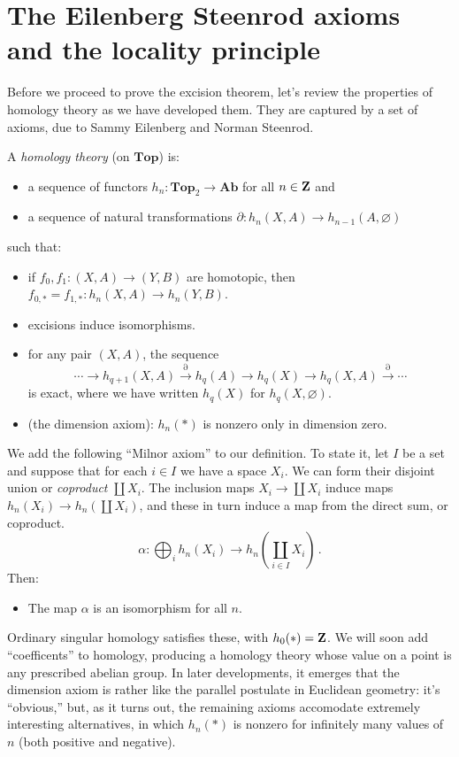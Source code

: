 \section{The Eilenberg Steenrod axioms and the locality principle}


Before we proceed to prove the excision theorem, let's review the properties of homology theory as we have developed them. They are captured by a set of axioms, due to Sammy Eilenberg and Norman Steenrod. 
\begin{definition}
A {\em homology theory} (on $\mathbf{Top}$) is:
\begin{itemize}
\item a sequence of functors $h_n:\mathbf{Top}_2\to\mathbf{Ab}$ for all $n\in\mathbf Z$ and
\item a sequence of natural transformations $\partial:h_n(X,A)\to h_{n-1}(A,\varnothing)$
\end{itemize}
such that:
\begin{itemize}
\item if $f_0,f_1:(X,A)\to (Y,B)$ are homotopic, then $f_{0,\ast}=f_{1,\ast}:h_n(X,A)\to h_n(Y,B)$.
\item excisions induce isomorphisms.
\item for any pair $(X,A)$, the sequence 
\begin{equation*}
\cdots\to h_{q+1}(X,A)\xrightarrow{\partial}h_q(A)\to h_q(X)\to h_q(X,A)\xrightarrow{\partial}\cdots
\end{equation*}
is exact, where we have written $h_q(X)$ for $h_q(X,\varnothing)$.
\item (the dimension axiom): $h_n(\ast)$ is nonzero only in dimension zero. 
\end{itemize}
\end{definition}
We add the following ``Milnor axiom'' to our definition. To state it,
let $I$ be a set and suppose that for each $i\in I$ we have a space $X_i$. We can form their disjoint union or {\em coproduct} $\coprod X_i$. The inclusion maps $X_i\to\coprod X_i$ induce maps $h_n(X_i)\to h_n(\coprod X_i)$, and these in turn induce a map from the direct sum, or coproduct. 
\[
\alpha:\bigoplus_i h_n(X_i)\to h_n\left(\coprod_{i\in I} X_i\right)\,.
\]
Then:
\begin{itemize}
\item The map $\alpha$ is an isomorphism for all $n$.
\end{itemize}

Ordinary singular homology satisfies these, with $h_0(\ast)=\mathbf Z$. We will soon add ``coefficents'' to homology, producing a homology theory whose value on a point is any prescribed abelian group. In later developments, it 
emerges that the dimension axiom is rather like the parallel postulate
in Euclidean geometry: it's ``obvious,'' but, as it turns out, the remaining
axioms accomodate extremely interesting alternatives, in which
$h_n(*)$ is nonzero for infinitely many values of $n$ (both positive and negative). 

